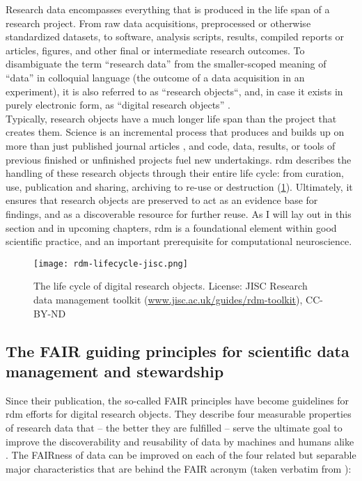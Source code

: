 Research data encompasses everything that is produced in the life span of a research project.
From raw data acquisitions, preprocessed or otherwise standardized datasets, to software, analysis scripts, results, compiled reports or articles, figures, and other final or intermediate research outcomes.
To disambiguate the term ``research data'' from the smaller-scoped meaning of ``data'' in colloquial language (the outcome of a data acquisition in an experiment), it is also referred to as ``research objects``, and, in case it exists in purely electronic form, as ``digital research objects'' \citep{bechhofer2010research}. \\
Typically, research objects have a much longer life span than the project that creates them.
Science is an incremental process that produces and builds up on more than just published journal articles \citep{mons2018data}, and code, data, results, or tools of previous finished or unfinished projects fuel new undertakings.
\gls{rdm} describes the handling of these research objects through their entire life cycle: from curation, use, publication and sharing, archiving to re-use or destruction (\cref{fig:rdm-lifecycle}).
Ultimately, it ensures that research objects are preserved to act as an evidence base for findings, and as a discoverable resource for further reuse.
As I will lay out in this section and in upcoming chapters, \gls{rdm} is a foundational element within good scientific practice, and an important prerequisite for computational neuroscience.


\begin{figure}
	\centering
	\texttt{[image: rdm-lifecycle-jisc.png]}
	\caption[The life cycle of digital research objects]{The life cycle of digital research objects. License: JISC Research data management toolkit (\href{https://www.jisc.ac.uk/guides/rdm-toolkit}{www.jisc.ac.uk/guides/rdm-toolkit}), CC-BY-ND}
	\label{fig:rdm-lifecycle}
\end{figure}


\subsection{The FAIR guiding principles for scientific data management and stewardship}

Since their publication, the so-called \gls{FAIR} principles \citep{wilkinson2016fair} have become guidelines for \gls{rdm} efforts for digital research objects.
They describe four measurable properties of research data that -- the better they are fulfilled -- serve the ultimate goal to improve the discoverability and reusability of data by machines and humans alike \citep{wilkinson2016fair}.
The \gls{FAIR}ness of data can be improved on each of the four related but separable major characteristics that are behind the \gls{FAIR} acronym (taken verbatim from \citet{wilkinson2016fair}):

